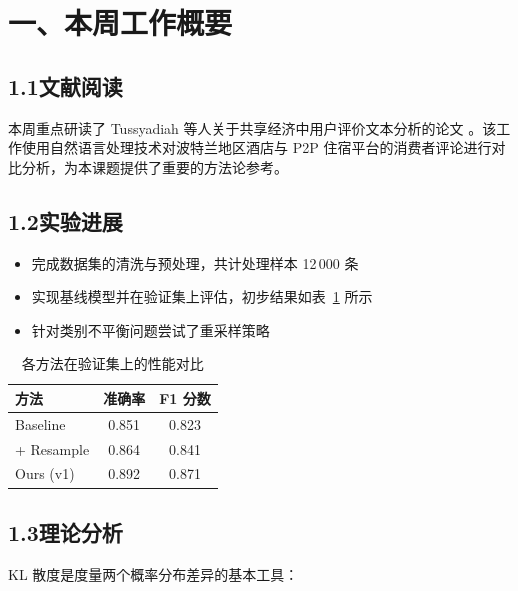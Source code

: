 \documentclass{sjtuweekly}
\begin{document}
\makeweeklytitle   %


\section{一、本周工作概要}

\subsection*{1.1\quad 文献阅读}

本周重点研读了 Tussyadiah 等人关于共享经济中用户评价文本分析的论文
\cite{tussyadiah2015hotels}。该工作使用自然语言处理技术对波特兰地区酒店与
P2P 住宿平台的消费者评论进行对比分析，为本课题提供了重要的方法论参考。

\subsection*{1.2\quad 实验进展}

\begin{itemize}
  \item 完成数据集的清洗与预处理，共计处理样本 12\,000 条
  \item 实现基线模型并在验证集上评估，初步结果如表~\ref{tab:result} 所示
  \item 针对类别不平衡问题尝试了重采样策略
\end{itemize}

\begin{table}[htbp]
  \centering
  \begin{tabular}{lcc}
    \toprule
    方法        & 准确率  & F1 分数 \\
    \midrule
    Baseline    & 0.851  & 0.823 \\
    + Resample  & 0.864  & 0.841 \\
    Ours (v1)   & 0.892  & 0.871 \\
    \bottomrule
  \end{tabular}
  \caption{各方法在验证集上的性能对比}
  \label{tab:result}
\end{table}

\subsection*{1.3\quad 理论分析}

KL 散度是度量两个概率分布差异的基本工具：
\end{document}
